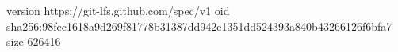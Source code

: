 version https://git-lfs.github.com/spec/v1
oid sha256:98fec1618a9d269f81778b31387dd942e1351dd524393a840b43266126f6bfa7
size 626416

